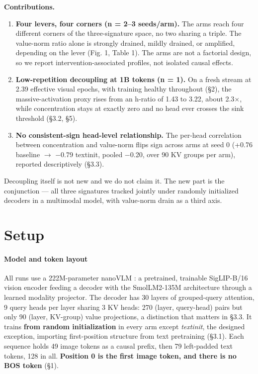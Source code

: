\documentclass{article}
\begin{document}
\textbf{Contributions.}

\begin{enumerate}
  \item \textbf{Four levers, four corners (n = 2--3 seeds/arm).} The arms reach four different corners of the three-signature space, no two sharing a triple. The value-norm ratio alone is strongly drained, mildly drained, or amplified, depending on the lever (Fig. 1, Table 1). The arms are not a factorial design, so we report intervention-associated profiles, not isolated causal effects.
  \item \textbf{Low-repetition decoupling at 1B tokens (n = 1).} On a fresh stream at 2.39 effective visual epochs, with training healthy throughout (\S2), the massive-activation proxy rises from an h-ratio of 1.43 to 3.22, about 2.3$\times$, while concentration stays at exactly zero and no head ever crosses the sink threshold (\S3.2, \S5).
  \item \textbf{No consistent-sign head-level relationship.} The per-head correlation between concentration and value-norm flips sign across arms at seed 0 (+0.76 baseline $\rightarrow$ $-$0.79 textinit, pooled $-$0.20, over 90 KV groups per arm), reported descriptively (\S3.3).
\end{enumerate}

Decoupling itself is not new \cite{ref9,ref10} and we do not claim it. The new part is the conjunction --- all three signatures tracked jointly under randomly initialized decoders in a multimodal model, with value-norm drain as a third axis.

\section{Setup}

\paragraph{Model and token layout} All runs use a 222M-parameter nanoVLM \cite{ref17}: a pretrained, trainable SigLIP-B/16 vision encoder \cite{ref18} feeding a decoder with the SmolLM2-135M architecture \cite{ref19} through a learned modality projector. The decoder has 30 layers of grouped-query attention, 9 query heads per layer sharing 3 KV heads: 270 (layer, query-head) pairs but only 90 (layer, KV-group) value projections, a distinction that matters in \S3.3. It trains \textbf{from random initialization} in every arm except \textit{textinit}, the designed exception, importing first-position structure from text pretraining (\S3.1). Each sequence holds 49 image tokens as a causal prefix, then 79 left-padded text tokens, 128 in all. \textbf{Position 0 is the first image token, and there is no BOS token} (\S1).
\end{document}
